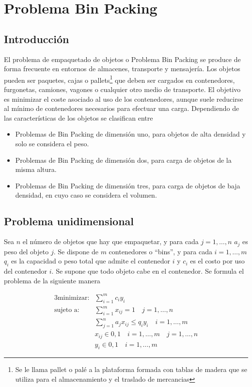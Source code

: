 \section{Problema Bin Packing}

\subsection{Introducción}

El problema de empaquetado de objetos o Problema Bin Packing se produce de forma frecuente en entornos de almacenes,
transporte y mensajería. Los objetos pueden ser paquetes, cajas o pallets\footnote{Se le llama pallet o palé a la plataforma
formada con tablas de madera que se utiliza para el almacenamiento y el traslado de mercancias} que deben ser cargados en 
contenedores, furgonetas, camiones, vagones o cualquier otro medio de transporte. El objetivo es minimizar el coste asociado
al uso de los contenedores, aunque suele reducirse al mínimo de contenedores necesarios para efectuar una carga. Dependiendo
de las características de los objetos se clasifican entre

\begin{itemize}
    \item Problemas de Bin Packing de dimensión uno, para objetos de alta densidad y solo se considera el peso.
    \item Problemas de Bin Packing de dimensión dos, para carga de objetos de la misma altura.
    \item Problemas de Bin Packing de dimensión tres, para carga de objetos de baja densidad, en cuyo caso se considera el
    volumen.
\end{itemize}

\subsection{Problema unidimensional}

Sea $n$ el número de objetos que hay que empaquetar, y para cada $j=1,\dots,n$ $a_j$ es peso del objeto $j$. Se dispone de $m$
contenedores o ``bins'', y para cada $i=1,\dots,m$ $q_i$ es la capacidad o peso total que admite el contenedor $i$ y $c_i$ es
el costo por uso del contenedor $i$. Se supone que todo objeto cabe en el contenedor. Se formula el problema de la siguiente
manera

\begin{alignat}{3}
    \text{minimizar:}   &   \sum_{i=1}^m c_{i}y_{i}               \\
    \text{sujeto a:}    &   \sum_{i=1}^m x_{ij}=1 \quad j=1,\dots,n             \\
                        &   \sum_{j=1}^n a_{j}x_{ij}\leq q_iy_i \quad i=1,\dots,m \\
                        &   x_{ij} \in {0, 1} \quad i=1,\dots,m \quad j=1,\dots,n \\
                        &   y_{i} \in {0, 1} \quad i=1,\dots,m
\end{alignat}

